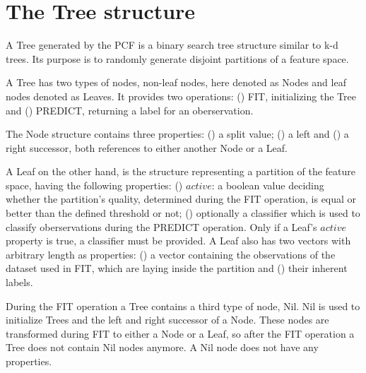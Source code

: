 \section{The Tree structure}
\label{sec:tree}

A Tree generated by the PCF is a binary search tree
structure similar to k-d trees. Its purpose is to randomly
generate disjoint partitions of a feature space.

A Tree has two types of nodes, non-leaf nodes, here denoted
as Nodes and leaf nodes denoted as Leaves. It provides two
operations: () FIT, initializing the Tree
and () PREDICT, returning a label for an
oberservation.

The Node structure contains three properties:
() a split value; () a left
and () a right successor, both references to
either another Node or a Leaf.

A Leaf on the other hand, is the structure
representing a partition of the feature space, having the
following properties: () $active$: a boolean
value deciding whether the partition's quality, determined
during the FIT operation, is equal or better than the
defined threshold or not; () optionally a
classifier which is used to classify oberservations during
the PREDICT operation. Only if a Leaf's $active$ property
is true, a classifier must be provided. A Leaf also has two
vectors with arbitrary length as properties:
() a vector containing the observations of
the dataset used in FIT, which are laying inside the
partition and () their inherent labels.

During the FIT operation a Tree contains a third type of
node, Nil. Nil is used to initialize Trees
and the left and right successor of a Node. These nodes are
transformed during FIT to either a Node or a Leaf, so after
the FIT operation a Tree does not contain Nil nodes
anymore. A Nil node does not have any properties.




